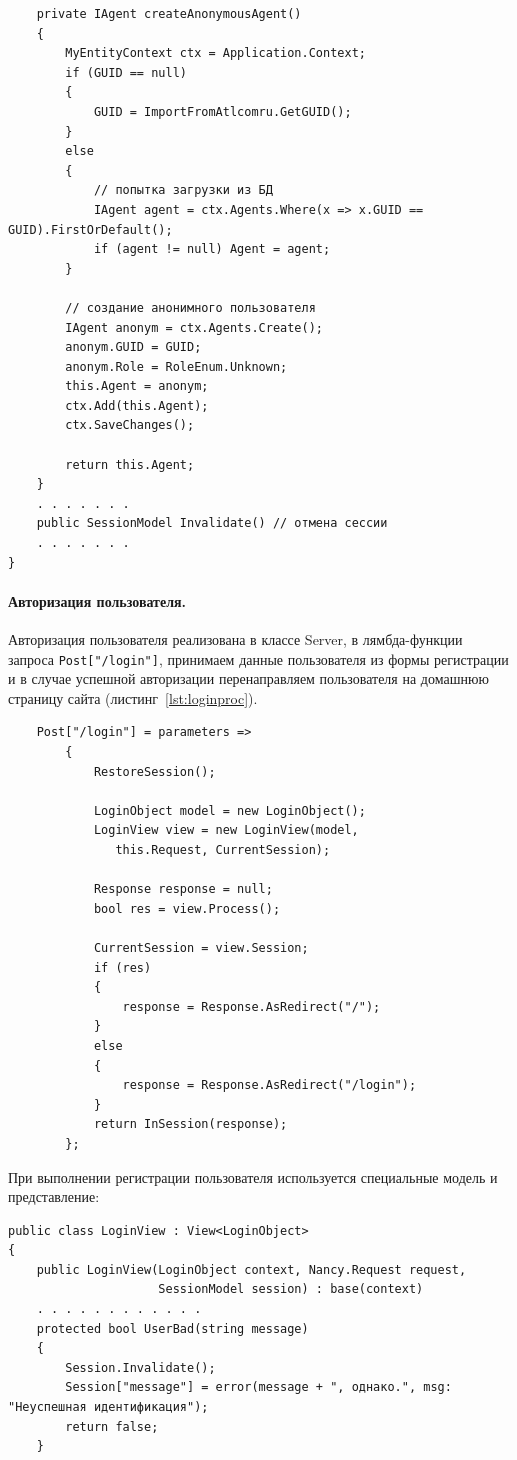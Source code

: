 \documentclass[a4paper,14pt,openany,final]{extreport} %
\begin{document}
{\begin{verbatim}
    private IAgent createAnonymousAgent()
    {
        MyEntityContext ctx = Application.Context;
        if (GUID == null)
        {
            GUID = ImportFromAtlcomru.GetGUID();
        }
        else
        {
            // попытка загрузки из БД
            IAgent agent = ctx.Agents.Where(x => x.GUID == GUID).FirstOrDefault();
            if (agent != null) Agent = agent;
        }

        // создание анонимного пользователя
        IAgent anonym = ctx.Agents.Create();
        anonym.GUID = GUID;
        anonym.Role = RoleEnum.Unknown;
        this.Agent = anonym;
        ctx.Add(this.Agent);
        ctx.SaveChanges();

        return this.Agent;
    }
    . . . . . . .
    public SessionModel Invalidate() // отмена сессии
    . . . . . . .
}
\end{verbatim}



\paragraph{Авторизация пользователя.}
Авторизация пользователя реализована в классе Server, в лямбда-функции запроса \verb|Post["/login"]|, принимаем данные пользователя из формы регистрации и в случае успешной авторизации перенаправляем пользователя на домашнюю страницу сайта (листинг~\ref{lst:loginproc}).

\begin{pzlisting}
\caption{Авторизация пользователя на сайте}\label{lst:loginproc}
\begin{verbatim}
    Post["/login"] = parameters =>
        {
            RestoreSession();

            LoginObject model = new LoginObject();
            LoginView view = new LoginView(model,
               this.Request, CurrentSession);

            Response response = null;
            bool res = view.Process();

            CurrentSession = view.Session;
            if (res)
            {
                response = Response.AsRedirect("/");
            }
            else
            {
                response = Response.AsRedirect("/login");
            }
            return InSession(response);
        };
\end{verbatim}
\end{pzlisting}

При выполнении регистрации пользователя используется специальные модель и представление:
\begin{verbatim}
public class LoginView : View<LoginObject>
{
    public LoginView(LoginObject context, Nancy.Request request,
                     SessionModel session) : base(context)
    . . . . . . . . . . . .
    protected bool UserBad(string message)
    {
        Session.Invalidate();
        Session["message"] = error(message + ", однако.", msg: "Неуспешная идентификация");
        return false;
    }


\end{verbatim}}
\end{document}

